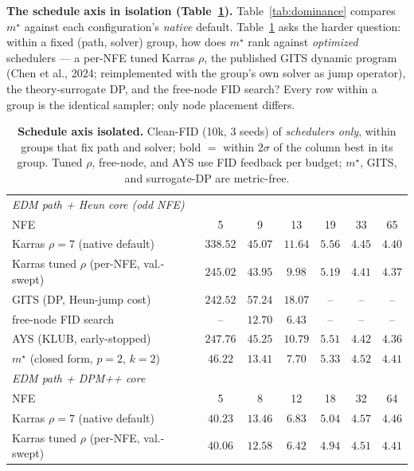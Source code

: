 \documentclass[11pt]{article}
\begin{document}
\medskip
\noindent\textbf{The schedule axis in isolation (Table~\ref{tab:schedaxis}).}
Table~\ref{tab:dominance} compares $m^\star$ against each configuration's
\emph{native} default. Table~\ref{tab:schedaxis} asks the harder question:
within a fixed (path, solver) group, how does $m^\star$ rank against
\emph{optimized} schedulers --- a per-NFE tuned Karras $\rho$, the
published GITS dynamic program (Chen et al., 2024; reimplemented with the
group's own solver as jump operator), the theory-surrogate DP, and the
free-node FID search? Every row within a group is the identical sampler;
only node placement differs.

\begin{table}[p]\centering\small
\caption{\textbf{Schedule axis isolated.} Clean-FID (10k, 3 seeds) of
\emph{schedulers only}, within groups that fix path and solver; bold $=$
within $2\sigma$ of the column best in its group. Tuned $\rho$, free-node,
and AYS use FID feedback per budget; $m^\star$, GITS, and surrogate-DP are
metric-free.}
\label{tab:schedaxis}
\setlength{\tabcolsep}{5pt}
\begin{tabular}{lcccccc}
\toprule
\multicolumn{7}{l}{\emph{EDM path + Heun core (odd NFE)}}\\[1pt]
\quad NFE & 5 & 9 & 13 & 19 & 33 & 65\\
\quad Karras $\rho\!=\!7$ (native default) & $338.52$ & $45.07$ & $11.64$ & $5.56$ & $\mathbf{4.45}$ & $\mathbf{4.40}$\\
\quad Karras tuned $\rho$ (per-NFE, val.-swept) & $245.02$ & $43.95$ & $9.98$ & $\mathbf{5.19}$ & $\mathbf{4.41}$ & $\mathbf{4.37}$\\
\quad GITS (DP, Heun-jump cost) & $242.52$ & $57.24$ & $18.07$ & -- & -- & --\\
\quad free-node FID search & -- & $\mathbf{12.70}$ & $\mathbf{6.43}$ & -- & -- & --\\
\quad AYS (KLUB, early-stopped) & $247.76$ & $45.25$ & $10.79$ & $5.51$ & $\mathbf{4.42}$ & $\mathbf{4.36}$\\
\quad $m^\star$ (closed form, $p\!=\!2$, $k\!=\!2$) & $\mathbf{46.22}$ & $13.41$ & $7.70$ & $5.33$ & $4.52$ & $\mathbf{4.41}$\\
\midrule
\multicolumn{7}{l}{\emph{EDM path + DPM++ core}}\\[1pt]
\quad NFE & 5 & 8 & 12 & 18 & 32 & 64\\
\quad Karras $\rho\!=\!7$ (native default) & $40.23$ & $13.46$ & $6.83$ & $5.04$ & $\mathbf{4.57}$ & $\mathbf{4.46}$\\
\quad Karras tuned $\rho$ (per-NFE, val.-swept) & $40.06$ & $12.58$ & $6.42$ & $\mathbf{4.94}$ & $\mathbf{4.51}$ & $\mathbf{4.41}$\\

\end{tabular}
\end{table}
\end{document}
